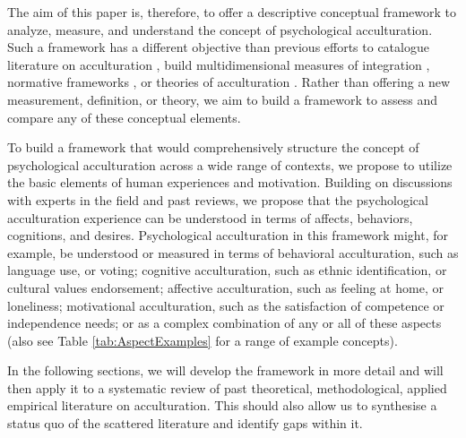\documentclass[man, 12pt, a4paper]{apa7}
\begin{document}
The aim of this paper is, therefore, to offer a descriptive conceptual framework to analyze, measure, and understand the concept of psychological acculturation. Such a framework has a different objective than previous efforts to catalogue literature on acculturation \citep[e.g.,][]{Castels2003}, build multidimensional measures of integration \citep[e.g.,][]{Harder2018}, normative frameworks \citep[e.g.,][]{Ager2008a}, or theories of acculturation \citep[e.g.,][]{Berry2005}. Rather than offering a new measurement, definition, or theory, we aim to build a framework to assess and compare any of these conceptual elements. 

To build a framework that would comprehensively structure the concept of psychological acculturation across a wide range of contexts, we propose to utilize the basic elements of human experiences and motivation.
Building on discussions with experts in the field and past reviews, we propose that the psychological acculturation experience can be understood in terms of affects, behaviors, cognitions, and desires. Psychological acculturation in this framework might, for example, be understood or measured in terms of behavioral acculturation, such as language use, or voting; cognitive acculturation, such as ethnic identification, or cultural values endorsement; affective acculturation, such as feeling at home, or loneliness; motivational acculturation, such as the satisfaction of competence or independence needs; or as a complex combination of any or all of these aspects (also see Table \ref{tab:AspectExamples} for a range of example concepts). 

In the following sections, we will develop the framework in more detail and will then apply it to a systematic review of past theoretical, methodological, applied empirical literature on acculturation. This should also allow us to synthesise a status quo of the scattered literature and identify gaps within it.


\end{document}
